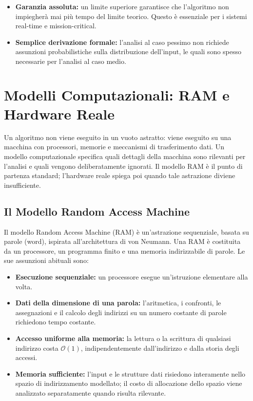 \begin{itemize}
  \item \textbf{Garanzia assoluta:} un limite superiore garantisce che l'algoritmo non impiegherà mai più tempo del limite teorico. Questo è essenziale per i sistemi real-time e mission-critical.
  \item \textbf{Semplice derivazione formale:} l'analisi al caso pessimo non richiede assunzioni probabilistiche sulla distribuzione dell'input, le quali sono spesso necessarie per l'analisi al caso medio.
\end{itemize}

\FloatBarrier
\section{Modelli Computazionali: RAM e Hardware Reale}
\label{sec:ram-model}

Un algoritmo non viene eseguito in un vuoto astratto: viene eseguito su una macchina con processori, memorie e meccanismi di trasferimento dati. Un modello computazionale specifica quali dettagli della macchina sono rilevanti per l'analisi e quali vengono deliberatamente ignorati. Il modello RAM è il punto di partenza standard; l'hardware reale spiega poi quando tale astrazione diviene insufficiente.

\FloatBarrier
\subsection{Il Modello Random Access Machine}

Il modello Random Access Machine (RAM) è un'astrazione sequenziale, basata su parole (word), ispirata all'architettura di von Neumann. Una RAM è costituita da un processore, un programma finito e una memoria indirizzabile di parole. Le sue assunzioni abituali sono:

\begin{itemize}
  \item \textbf{Esecuzione sequenziale:} un processore esegue un'istruzione elementare alla volta.
  \item \textbf{Dati della dimensione di una parola:} l'aritmetica, i confronti, le assegnazioni e il calcolo degli indirizzi su un numero costante di parole richiedono tempo costante.
  \item \textbf{Accesso uniforme alla memoria:} la lettura o la scrittura di qualsiasi indirizzo costa $\mathcal{O}(1)$, indipendentemente dall'indirizzo e dalla storia degli accessi.
  \item \textbf{Memoria sufficiente:} l'input e le strutture dati risiedono interamente nello spazio di indirizzamento modellato; il costo di allocazione dello spazio viene analizzato separatamente quando risulta rilevante.
\end{itemize}

